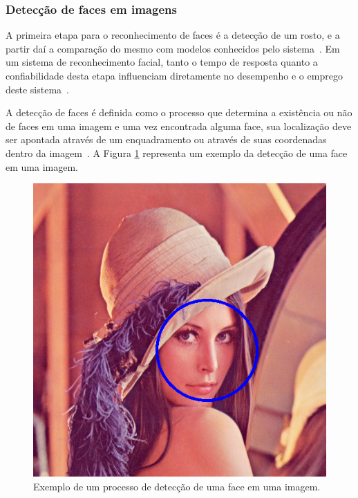 
\subsubsection{Detecção de faces em imagens}
\label{ref:viola-jones}
	
	A primeira etapa para o reconhecimento de faces é a detecção de um rosto, e a
	partir daí a comparação do mesmo com modelos conhecidos pelo sistema~\cite{hong,
	oliveira}. Em um sistema de reconhecimento facial, tanto o tempo de resposta
	quanto a confiabilidade desta etapa influenciam diretamente no desempenho e o
	emprego deste sistema~\cite{oliveira}.
	
	A detecção de faces é definida como o processo que determina a existência ou não
	de faces em uma imagem e uma vez encontrada alguma face, sua localização deve
	ser apontada através de um enquadramento ou através de suas coordenadas dentro
	da imagem~\cite{oliveira}. A Figura \ref{enquadramentoRosto} representa um
	exemplo da detecção de uma face em uma imagem.

	\begin{figure}[htb]
		\begin{center}
			\includegraphics[scale=0.3]{figuras/2.FundamentacaoTeorica/enquadramentoRosto.png}
		\end{center}
		\caption{Exemplo de um processo de detecção de uma face em uma imagem.}
		\label{enquadramentoRosto}
	\end{figure}

